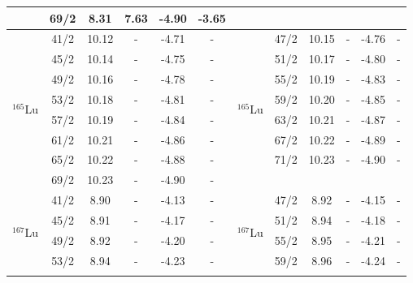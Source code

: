 \begin{table}
{\begin{tabular}{|c|c|c|c|c|c|c|ccccc|}
    & 69/2 & 8.31 & 7.63 & -4.90 & -3.65 &  & \multicolumn{5}{c|}{} \\ \hline
    \multirow{8}{*}{$^{165}$Lu} & 41/2 & 10.12 & - & -4.71 & - & \multirow{8}{*}{$^{165}$Lu} & \multicolumn{1}{c|}{47/2} & \multicolumn{1}{c|}{10.15} & \multicolumn{1}{c|}{-} & \multicolumn{1}{c|}{-4.76} & - \\ \cline{2-6} \cline{8-12} 
    & 45/2 & 10.14 & - & -4.75 & - &  & \multicolumn{1}{c|}{51/2} & \multicolumn{1}{c|}{10.17} & \multicolumn{1}{c|}{-} & \multicolumn{1}{c|}{-4.80} & - \\ \cline{2-6} \cline{8-12} 
    & 49/2 & 10.16 & - & -4.78 & - &  & \multicolumn{1}{c|}{55/2} & \multicolumn{1}{c|}{10.19} & \multicolumn{1}{c|}{-} & \multicolumn{1}{c|}{-4.83} & - \\ \cline{2-6} \cline{8-12} 
    & 53/2 & 10.18 & - & -4.81 & - &  & \multicolumn{1}{c|}{59/2} & \multicolumn{1}{c|}{10.20} & \multicolumn{1}{c|}{-} & \multicolumn{1}{c|}{-4.85} & - \\ \cline{2-6} \cline{8-12} 
    & 57/2 & 10.19 & - & -4.84 & - &  & \multicolumn{1}{c|}{63/2} & \multicolumn{1}{c|}{10.21} & \multicolumn{1}{c|}{-} & \multicolumn{1}{c|}{-4.87} & - \\ \cline{2-6} \cline{8-12} 
    & 61/2 & 10.21 & - & -4.86 & - &  & \multicolumn{1}{c|}{67/2} & \multicolumn{1}{c|}{10.22} & \multicolumn{1}{c|}{-} & \multicolumn{1}{c|}{-4.89} & - \\ \cline{2-6} \cline{8-12} 
    & 65/2 & 10.22 & - & -4.88 & - &  & \multicolumn{1}{c|}{71/2} & \multicolumn{1}{c|}{10.23} & \multicolumn{1}{c|}{-} & \multicolumn{1}{c|}{-4.90} & - \\ \cline{2-6} \cline{8-12} 
    & 69/2 & 10.23 & - & -4.90 & - &  & \multicolumn{5}{c|}{} \\ \hline
    \multirow{8}{*}{$^{167}$Lu} & 41/2 & 8.90 & - & -4.13 & - & \multirow{8}{*}{$^{167}$Lu} & \multicolumn{1}{c|}{47/2} & \multicolumn{1}{c|}{8.92} & \multicolumn{1}{c|}{-} & \multicolumn{1}{c|}{-4.15} & - \\ \cline{2-6} \cline{8-12} 
    & 45/2 & 8.91 & - & -4.17 & - &  & \multicolumn{1}{c|}{51/2} & \multicolumn{1}{c|}{8.94} & \multicolumn{1}{c|}{-} & \multicolumn{1}{c|}{-4.18} & - \\ \cline{2-6} \cline{8-12} 
    & 49/2 & 8.92 & - & -4.20 & - &  & \multicolumn{1}{c|}{55/2} & \multicolumn{1}{c|}{8.95} & \multicolumn{1}{c|}{-} & \multicolumn{1}{c|}{-4.21} & - \\ \cline{2-6} \cline{8-12} 
    & 53/2 & 8.94 & - & -4.23 & - &  & \multicolumn{1}{c|}{59/2} & \multicolumn{1}{c|}{8.96} & \multicolumn{1}{c|}{-} & \multicolumn{1}{c|}{-4.24} & - \\ \cline{2-6} \cline{8-12} 

\end{tabular}}
\end{table}
